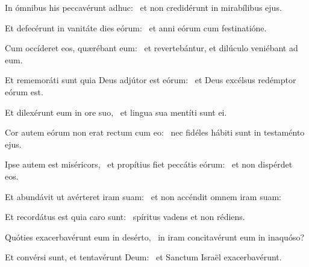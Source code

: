 
\item In ómnibus his peccavérunt adhuc:~\psstar{} et non credidérunt in mirabílibus ejus.

\item Et defecérunt in vanitáte dies eórum:~\psstar{} et anni eórum cum festinatióne.

\item Cum occíderet eos, quærébant eum:~\psstar{} et revertebántur, et dilúculo veniébant ad eum.

\item Et rememoráti sunt quia Deus adjútor est eórum:~\psstar{} et Deus excélsus redémptor eórum est.

\item Et dilexérunt eum in ore suo,~\psstar{} et lingua sua mentíti sunt ei.

\item Cor autem eórum non erat rectum cum eo:~\psstar{} nec fidéles hábiti sunt in testaménto ejus.

\item Ipse autem est miséricors,~\pscross{} et propítius fiet peccátis eórum:~\psstar{} et non dispérdet eos.

\item Et abundávit ut avérteret iram suam:~\psstar{} et non accéndit omnem iram suam:

\item Et recordátus est quia caro sunt:~\psstar{} spíritus vadens et non rédiens.

\item Quóties exacerbavérunt eum in desérto,~\psstar{} in iram concitavérunt eum in inaquóso?

\item Et convérsi sunt, et tentavérunt Deum:~\psstar{} et Sanctum Israël exacerbavérunt.
